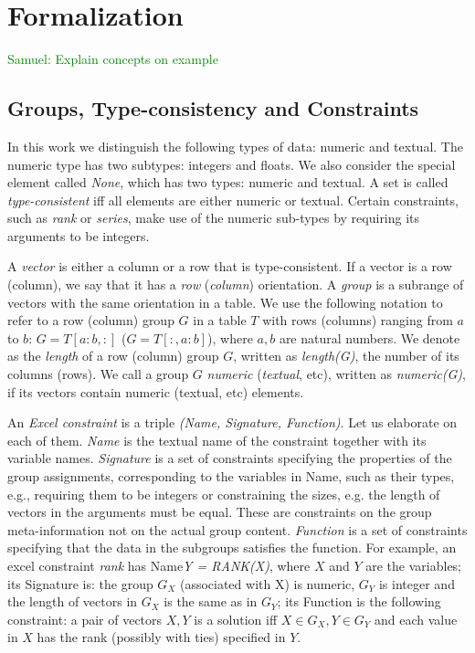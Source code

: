 \documentclass{ecai}
\newcommand{\samuel}[1]{\textcolor{green}{{\sc Samuel:} #1}\xspace}
\newcommand{\CName}{Name\xspace}
\newcommand{\CSignature}{Signature\xspace}
\newcommand{\CFunction}{Function\xspace}
\begin{document}
\section{Formalization}

\samuel{Explain concepts on example}
\subsection{Groups, Type-consistency and Constraints}
In this work we distinguish the following types of data: numeric and textual. The numeric type has two subtypes: integers and floats. We also consider the special element called \textit{None}, which has two types: numeric and textual. A set is called \textit{type-consistent} iff all elements are either numeric or textual. Certain constraints, such as \textit{rank} or \textit{series}, make use of the numeric sub-types by requiring its arguments to be integers.

A \textit{vector} is either a column or a row that is type-consistent. If a vector is a row (column), we say that it has a \textit{row} (\textit{column}) orientation. A \textit{group} is a subrange of vectors with the same orientation in a table. We use the following notation to refer to a row (column) group $G$ in a table $T$ with rows (columns) ranging from $a$ to $b$: $G = T[a{:}b,:]$ ($G = T[{:},a{:}b]$), where $a,b$ are natural numbers. We denote as the \textit{length} of a row (column) group $G$, written as \textit{length(G)}, the number of its columns (rows). We call a group $G$ \textit{numeric} (\textit{textual}, etc), written as \textit{numeric(G)}, if its vectors contain numeric (textual, etc) elements.

An \textit{Excel constraint} is a triple \textit{(\CName, \CSignature, \CFunction)}. Let us elaborate on each of them. \textit{\CName} is the textual name of the constraint together with its variable names. \textit{\CSignature} is a set of constraints specifying the properties of the group assignments, corresponding to the variables in \CName, such as their types, e.g., requiring them to be integers or constraining the sizes, e.g. the length of vectors in the arguments must be equal. These are constraints on the group meta-information not on the actual group content. \textit{\CFunction} is a set of constraints specifying that the data in the subgroups satisfies the function. For example, an excel constraint \textit{rank} has \CName \textit{Y = RANK(X)}, where $X$ and $Y$ are the variables; its \CSignature is: the group $G_X$ (associated with X) is numeric, $G_Y$ is integer and the length of vectors in $G_X$ is the same as in $G_Y$; its \CFunction is the following constraint: a pair of vectors $X,Y$ is a solution iff $X \in G_X, Y \in G_Y$ and each value in $X$ has the rank (possibly with ties) specified in $Y$.
\end{document}
